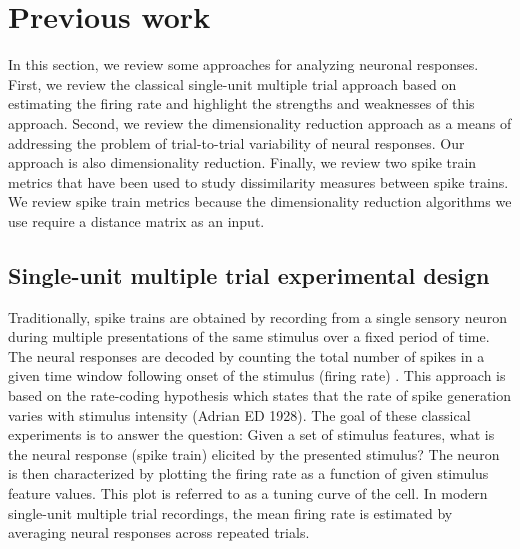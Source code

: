 
\section{Previous work}
In this section, we review some approaches for analyzing neuronal responses.
First, we review the classical single-unit multiple trial approach based 
on estimating the firing rate and highlight the strengths
and weaknesses of this approach. Second, we review the dimensionality
reduction approach as a means of addressing the problem of trial-to-trial variability of neural responses. Our approach is also dimensionality reduction. Finally, we review two spike train metrics that have been used to study dissimilarity measures between spike trains. 
We review spike train metrics because the dimensionality reduction algorithms we use require a distance matrix as an input.


\subsection{Single-unit multiple trial experimental design}
Traditionally, spike trains are obtained by recording from a single sensory neuron during multiple presentations of the same stimulus over a fixed period of time. The neural responses are decoded by counting the total number of spikes in a given time window following onset of the stimulus (firing rate) \cite{Abbott2001}.
This approach is based on the rate-coding hypothesis which states that the rate of spike generation varies with stimulus intensity (Adrian ED 1928).
The goal of these classical experiments is to answer the question:
Given a set of stimulus features, what is the neural response (spike train) elicited by the presented stimulus? The neuron is then characterized by plotting the firing rate as a function of given stimulus feature values. This plot is referred to as a tuning curve of the cell.
In modern single-unit multiple trial recordings, the mean firing rate is estimated by averaging neural responses across repeated trials.



